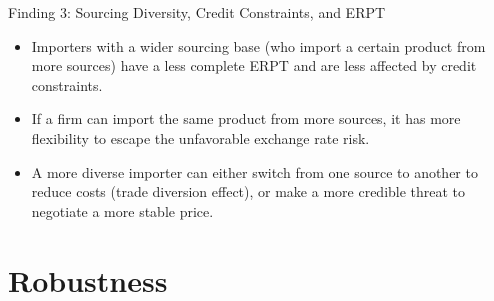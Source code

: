 \documentclass[10pt]{beamer}
\begin{document}
\begin{frame}{Finding 3: Sourcing Diversity, Credit Constraints, and ERPT}
	\begin{tcolorbox}[colback=blue!5!white, colframe=blue!75!black,title=Key Finding 3]
		\begin{itemize}
			\item Importers with a wider sourcing base (who import a certain product from more sources) have a less complete ERPT and are less affected by credit constraints.
		\end{itemize}
	\end{tcolorbox}
	\begin{itemize}
		\item If a firm can import the same product from more sources, it has more flexibility to escape the unfavorable exchange rate risk.
		\item A more diverse importer can either switch from one source to another to reduce costs (trade diversion effect), or make a more credible threat to negotiate a more stable price.
	\end{itemize}
\end{frame}

\section{Robustness}
\end{document}
